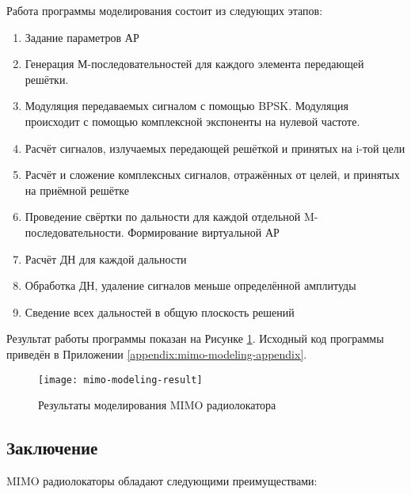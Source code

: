 Работа программы моделирования состоит из следующих этапов:

\begin{enumerate}
    \item Задание параметров АР
    \item Генерация М-последовательностей для каждого элемента передающей решётки. 
    \item Модуляция передаваемых сигналом с помощью BPSK. Модуляция происходит с помощью комплексной экспоненты на нулевой частоте.
    \item Расчёт сигналов, излучаемых передающей решёткой и принятых на i-той цели
    \item Расчёт и сложение комплексных сигналов, отражённых от целей, и принятых на приёмной решётке
    \item Проведение свёртки по дальности для каждой отдельной M-последовательности. Формирование виртуальной АР
    \item Расчёт ДН для каждой дальности
    \item Обработка ДН, удаление сигналов меньше определённой амплитуды
    \item Сведение всех дальностей в общую плоскость решений
\end{enumerate}

Результат работы программы показан на Рисунке \ref{fig:mimo-modeling-result}. 
Исходный код программы приведён в Приложении \ref{appendix:mimo-modeling-appendix}.


\begin{figure}[H]
    \centering
    \texttt{[image: mimo-modeling-result]}
    \caption{Результаты моделирования MIMO радиолокатора}%
    \label{fig:mimo-modeling-result}
\end{figure}

\subsection{Заключение}

MIMO радиолокаторы обладают следующими преимуществами:

